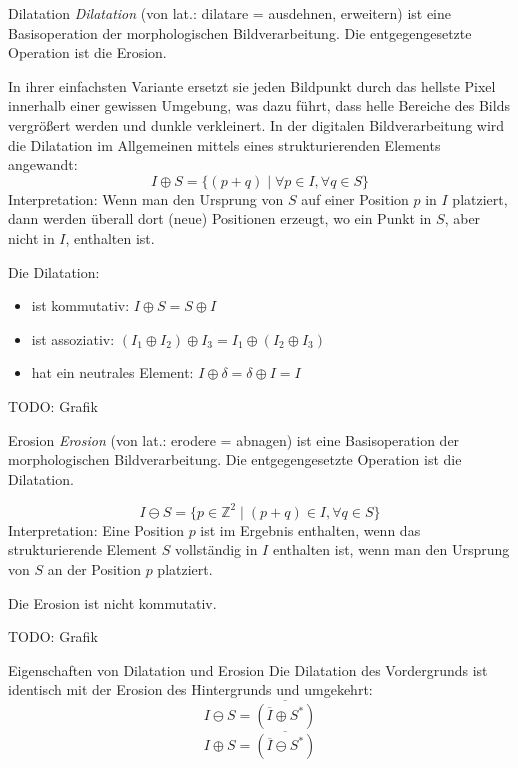 \begin{defi}{Dilatation}
    \emph{Dilatation} (von lat.: dilatare = ausdehnen, erweitern) ist eine Basisoperation der morphologischen Bildverarbeitung.
    Die entgegengesetzte Operation ist die Erosion.

    In ihrer einfachsten Variante ersetzt sie jeden Bildpunkt durch das hellste Pixel innerhalb einer gewissen Umgebung, was dazu führt, dass helle Bereiche des Bilds vergrößert werden und dunkle verkleinert.
    In der digitalen Bildverarbeitung wird die Dilatation im Allgemeinen mittels eines strukturierenden Elements angewandt:
    \[
        I \oplus S = \{ (p + q) \mid \forall p \in I, \forall q \in S \}
    \]
    Interpretation: Wenn man den Ursprung von $S$ auf einer Position $p$ in $I$ platziert, dann werden überall dort (neue) Positionen erzeugt, wo ein Punkt in $S$, aber nicht in $I$, enthalten ist.

    Die Dilatation:
    \begin{itemize}
        \item ist kommutativ: $I \oplus S = S \oplus I$
        \item ist assoziativ: $(I_1 \oplus I_2) \oplus I_3 = I_1 \oplus (I_2 \oplus I_3)$
        \item hat ein neutrales Element: $I \oplus \delta = \delta \oplus I = I$
    \end{itemize}

    TODO: Grafik
\end{defi}

\begin{defi}{Erosion}
    \emph{Erosion} (von lat.: erodere = abnagen) ist eine Basisoperation der morphologischen Bildverarbeitung.
    Die entgegengesetzte Operation ist die Dilatation.

    \[
        I \ominus S = \{ p \in \mathbb{Z}^2 \mid (p + q) \in I, \forall q \in S \}
    \]
    Interpretation: Eine Position $p$ ist im Ergebnis enthalten, wenn das strukturierende Element $S$ vollständig in $I$ enthalten ist, wenn man den Ursprung von $S$ an der Position $p$ platziert.

    Die Erosion ist nicht kommutativ.

    TODO: Grafik
\end{defi}

\begin{bonus}{Eigenschaften von Dilatation und Erosion}
    Die Dilatation des Vordergrunds ist identisch mit der Erosion des Hintergrunds und umgekehrt:
    \[
        I \ominus S = \overline{(\overline{I} \oplus S^*)}
    \]
    \[
        I \oplus S = \overline{(\overline{I} \ominus S^*)}
    \]
\end{bonus}

